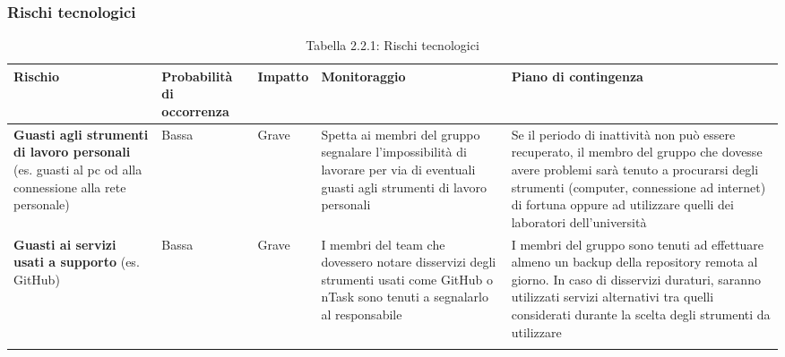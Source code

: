 	\subsubsection{Rischi tecnologici}
\renewcommand{\arraystretch}{1.5}
\begin{longtable}{| m{8em} | m{6em} | m{4em} | m{9em} | m{9em} |}
\hline
\rowcolor{title_row}
\textbf{\color{title_text}Rischio} & \textbf{\color{title_text}Probabilità di occorrenza} & \textbf{\color{title_text}Impatto} & \textbf{\color{title_text}Monitoraggio} & \textbf{\color{title_text}Piano di contingenza} \\
\endhead
\hline \textbf{Guasti agli strumenti di lavoro personali} (es. guasti al pc od alla connessione alla rete personale) & Bassa & Grave &
	Spetta ai membri del gruppo segnalare l'impossibilità di lavorare per via di eventuali guasti agli strumenti di lavoro personali &
	Se il periodo di inattività non può essere recuperato, il membro del gruppo che dovesse avere problemi sarà tenuto a procurarsi degli strumenti (computer, connessione ad internet) di fortuna oppure ad utilizzare quelli dei laboratori dell'università \\
\hline \textbf{Guasti ai servizi usati a supporto} (es. GitHub) & Bassa & Grave &
	I membri del team che dovessero notare disservizi degli strumenti usati come GitHub o nTask sono tenuti a segnalarlo al responsabile &
	I membri del gruppo sono tenuti ad effettuare almeno un backup della repository remota al giorno. In caso di disservizi duraturi, saranno utilizzati servizi alternativi tra quelli considerati	durante la scelta degli strumenti da utilizzare\\
\hline
\caption{Tabella 2.2.1: Rischi tecnologici\label{}}
\end{longtable}
\pagebreak
\renewcommand{\arraystretch}{1}
